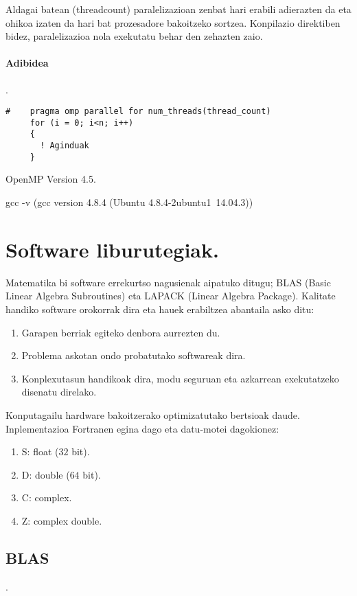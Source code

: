 Aldagai batean (threadcount) paralelizazioan zenbat hari erabili adierazten da eta ohikoa izaten da hari bat prozesadore bakoitzeko sortzea.  Konpilazio direktiben bidez,  paralelizazioa nola exekutatu behar den zehazten zaio.

\paragraph*{\textbf{Adibidea}}.

\begin{lstlisting}
#    pragma omp parallel for num_threads(thread_count) 
     for (i = 0; i<n; i++)
     {
       ! Aginduak 
     }
\end{lstlisting}

OpenMP Version 4.5.	

gcc -v (gcc version 4.8.4 (Ubuntu 4.8.4-2ubuntu1~14.04.3))


\section{Software liburutegiak.}

Matematika bi software errekurtso nagusienak aipatuko ditugu; BLAS (Basic Linear Algebra Subroutines) eta LAPACK (Linear Algebra Package). Kalitate handiko software orokorrak dira eta hauek erabiltzea abantaila asko ditu: 

\begin{enumerate}
\item Garapen berriak egiteko denbora aurrezten du. 
\item Problema askotan ondo probatutako softwareak dira.
\item Konplexutasun handikoak dira, modu seguruan eta azkarrean exekutatzeko disenatu direlako. 
\end{enumerate}

Konputagailu hardware bakoitzerako optimizatutako bertsioak daude. Inplementazioa Fortranen egina dago eta datu-motei dagokionez:

\begin{enumerate}
\item S: float ($32$ bit).
\item D: double ($64$ bit).
\item C: complex.
\item Z: complex double.
\end{enumerate}   

\subsection*{\textbf{BLAS}}.

